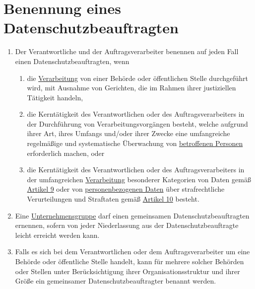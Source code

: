\chapter{Benennung eines Datenschutzbeauftragten}
\label{ch:37}


\begin{enumerate}

  \item Der Verantwortliche und der Auftragsverarbeiter benennen auf jeden Fall einen Datenschutzbeauftragten, wenn
  \label{itm:37-1}

  \begin{enumerate}
  
    \item die \hyperref[itm:04-2]{Verarbeitung} von einer Behörde oder öffentlichen Stelle durchgeführt wird, mit Ausnahme von Gerichten, die
     im Rahmen ihrer justiziellen Tätigkeit handeln,
    \label{itm:37-1a}

    \item die Kerntätigkeit des Verantwortlichen oder des Auftragsverarbeiters in der Durchführung von
     Verarbeitungsvorgängen besteht, welche aufgrund ihrer Art, ihres Umfangs und/oder ihrer Zwecke eine umfangreiche
     regelmäßige und systematische Überwachung von \hyperref[itm:04-1]{betroffenen Personen} erforderlich machen, oder
    \label{itm:37-1b}

    \item die Kerntätigkeit des Verantwortlichen oder des Auftragsverarbeiters in der umfangreichen \hyperref[itm:04-2]{Verarbeitung}
     besonderer Kategorien von Daten gemäß \hyperref[ch:9]{Artikel 9} oder von \hyperref[itm:04-1]{personenbezogenen Daten} über
     strafrechtliche Verurteilungen und Straftaten gemäß \hyperref[ch:10]{Artikel 10} besteht.
    \label{itm:37-1c}

  \end{enumerate}

  \item Eine \hyperref[itm:04-19]{Unternehmensgruppe} darf einen gemeinsamen Datenschutzbeauftragten ernennen, sofern von jeder Niederlassung
   aus der Datenschutzbeauftragte leicht erreicht werden kann.
  \label{itm:37-2}

  \item Falls es sich bei dem Verantwortlichen oder dem Auftragsverarbeiter um eine Behörde oder öffentliche Stelle
   handelt, kann für mehrere solcher Behörden oder Stellen unter Berücksichtigung ihrer Organisationsstruktur und ihrer
   Größe ein gemeinsamer Datenschutzbeauftragter benannt werden.
  \label{itm:37-3}


\end{enumerate}

